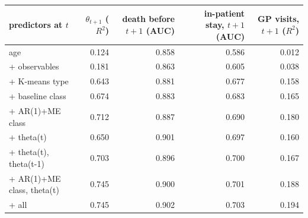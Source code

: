 \begin{tabular}{lrrrr}
\toprule
predictors at $t$ & $\theta_{t+1}$ ($R^2$) & death before $t+1$ (AUC) & in-patient stay, $t+1$ (AUC) & GP visits, $t+1$ ($R^2$) \\
\midrule
age & 0.124 & 0.858 & 0.586 & 0.012 \\
+ observables & 0.181 & 0.863 & 0.605 & 0.038 \\
+ K-means type & 0.643 & 0.881 & 0.677 & 0.158 \\
+ baseline class & 0.674 & 0.883 & 0.683 & 0.165 \\
+ AR(1)+ME class & 0.712 & 0.887 & 0.690 & 0.180 \\
+ theta(t) & 0.650 & 0.901 & 0.697 & 0.160 \\
+ theta(t), theta(t-1) & 0.703 & 0.896 & 0.700 & 0.167 \\
+ AR(1)+ME class, theta(t) & 0.745 & 0.900 & 0.701 & 0.188 \\
+ all & 0.745 & 0.902 & 0.703 & 0.194 \\
\bottomrule
\end{tabular}
